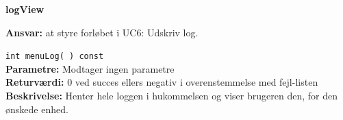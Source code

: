 {\centering
\textbf{logView}\par
}
\textbf{Ansvar:} at styre forløbet i UC6: Udskriv log. \

\verb+int menuLog( ) const+ \\
\textbf{Parametre:} Modtager ingen parametre \\
\textbf{Returværdi:} 0 ved succes ellers negativ i overenstemmelse med fejl-listen \\
\textbf{Beskrivelse:} Henter hele loggen i hukommelsen og viser brugeren den, for den ønskede enhed.\\

